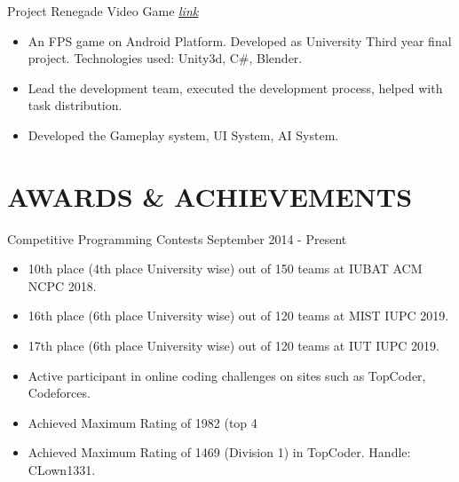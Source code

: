 \documentclass{resumestyle}
\begin{document}
    \projectsubsection%
        {Project Renegade}%
        {Video Game \hfill
        \textit{\href{https://github.com/CLown1331/Unity-FPS/releases/tag/1.0.0/}{\textcolor{link}{link}}}}%
    \begin{itemize}[labelsep=4pt,leftmargin=*,topsep=5pt,partopsep=0pt,itemsep=1pt]%
        \item An FPS game on Android Platform. Developed as University Third year final project. Technologies used: Unity3d, C\#, Blender.
        \item Lead the development team, executed the development process, helped with task distribution.
        \item Developed the Gameplay system, UI System, AI System.
    \end{itemize}%

\vspace{-4pt}

\section{AWARDS \& ACHIEVEMENTS}%

    \worksubsection%
        {Competitive Programming Contests}%
        {September 2014 - Present}%
        {}%
    
    \begin{itemize}[labelsep=4pt,leftmargin=*,topsep=5pt,partopsep=0pt,itemsep=1pt]%
        \item 10th place (4th place University wise) out of 150 teams at IUBAT ACM NCPC 2018.
        \item 16th place (6th place University wise) out of 120 teams at MIST IUPC 2019.
        \item 17th place (6th place University wise) out of 120 teams at IUT IUPC 2019.
        \item Active participant in online coding challenges on sites such as TopCoder, Codeforces.
        \item Achieved Maximum Rating of 1982 (top 4%
        \item Achieved Maximum Rating of 1469 (Division 1) in TopCoder. Handle: CLown1331.
    \end{itemize}%
\end{document}

